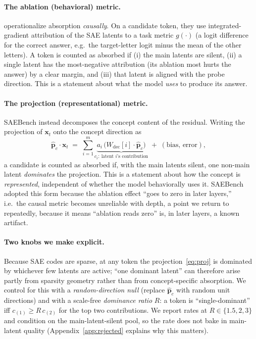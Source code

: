 \documentclass[11pt]{article}
\newcommand{\Wdec}{W_{\mathrm{dec}}}
\theoremstyle{definition}
\begin{document}
\paragraph{The ablation (behavioral) metric.}
\citet{chanin2024absorption} operationalize absorption \emph{causally}. On a candidate token, they use
integrated-gradient attribution of the SAE latents to a task metric $g(\cdot)$ (a logit difference for the
correct answer, e.g.\ the target-letter logit minus the mean of the other letters). A token is counted as
absorbed if (i) the main latents are silent, (ii) a single latent has the most-negative attribution (its
ablation most hurts the answer) by a clear margin, and (iii) that latent is aligned with the probe
direction. This is a statement about what the model \emph{uses} to produce its answer.

\paragraph{The projection (representational) metric.}
SAEBench \citep{karvonen2025saebench} instead decomposes the concept content of the residual. Writing the
projection of $\mathbf{x}_t$ onto the concept direction as
\begin{equation}
\hat{\mathbf p}_c\cdot \mathbf{x}_t \;=\; \sum_{i=1}^{m} \underbrace{a_i\,\big(\Wdec[i]\cdot\hat{\mathbf p}_c\big)}_{\textstyle c_i:\ \text{latent }i\text{'s contribution}} \;+\;(\text{bias, error}),
\label{eq:proj}
\end{equation}
a candidate is counted as absorbed if, with the main latents silent, one non-main latent \emph{dominates}
the projection. This is a statement about how the concept is \emph{represented}, independent of whether the
model behaviorally uses it. SAEBench adopted this form because the ablation effect ``goes to zero in later
layers,'' i.e.\ the causal metric becomes unreliable with depth, a point we return to repeatedly, because
it means ``ablation reads zero'' is, in later layers, a known artifact.

\paragraph{Two knobs we make explicit.}
Because SAE codes are sparse, at any token the projection~\eqref{eq:proj} is dominated by whichever few
latents are active; ``one dominant latent'' can therefore arise partly from sparsity geometry rather than
from concept-specific absorption. We control for this with a \emph{random-direction null} (replace
$\hat{\mathbf p}_c$ with random unit directions) and with a scale-free \emph{dominance ratio} $R$: a token is
``single-dominant'' iff $c_{(1)}\ge R\,c_{(2)}$ for the top two contributions. We report rates at
$R\in\{1.5,2,3\}$ and condition on the main-latent-silent pool, so the rate does not bake in main-latent
quality (Appendix~\ref{app:rejected} explains why this matters).
\end{document}
